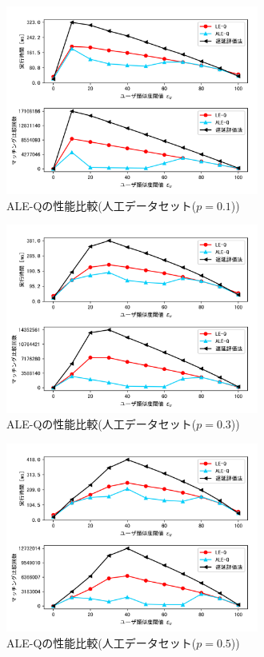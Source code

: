 \begin{figure}[H]
    \centering
    \includegraphics[width=8.3cm]{eimg/exp3_1.png}
    \caption{ALE-Qの性能比較(人工データセット($p=0.1$))}
    \label{fig:exp3_1}
\end{figure}
\begin{figure}[H]
    \centering
    \includegraphics[width=8.3cm]{eimg/exp3_3.png}
    \caption{ALE-Qの性能比較(人工データセット($p=0.3$))}
    \label{fig:exp3_3}
\end{figure}
\begin{figure}[H]
    \centering
    \includegraphics[width=8.3cm]{eimg/exp3_5.png}
    \caption{ALE-Qの性能比較(人工データセット($p=0.5$))}
    \label{fig:exp3_5}
\end{figure}
